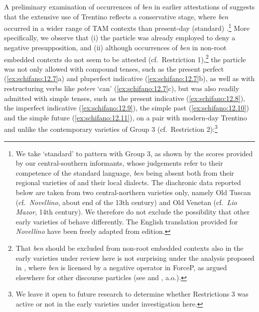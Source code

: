\documentclass[output=paper]{langsci/langscibook}
\begin{document}
A preliminary examination of occurrences of \emph{ben} in earlier attestations
of  suggests that the extensive use of Trentino reflects a
conservative stage, where \emph{ben} occurred in a wider range of \gls{TAM}
contexts than present-day (standard) .\footnote{We take
    \enquote*{standard}  to pattern with Group 3, as shown by the scores
    provided by our central-southern informants, whose judgements refer to
    their competence of the standard language, \emph{ben} being absent both
    from their regional varieties of  and their local  dialects.
    The diachronic data reported below are taken from two central-northern
    varieties only, namely Old Tuscan (cf.\ \emph{Novellino}, about end of the
    13th
    century) and Old Venetan (cf.\ \emph{Lio Mazor}, 14th century). We therefore
    do not exclude the possibility that other early varieties of 
    behave differently.  The English translation provided for \emph{Novellino}
    have been freely adapted from  edition.} More
    specifically, we observe that (i) the particle was already employed to deny
    a negative presupposition, and (ii) although occurrences of \emph{ben} in
    non-root embedded contexts do not seem to be attested (cf.\ Restriction
    1),\footnote{That \emph{ben} should be excluded from non-root embedded
        contexts also in the early varieties under review here is not
        surprising under the analysis proposed in \textcite{CognSchi2018b},
    where \emph{ben} is licensed by a negative operator in ForceP, as argued
elsewhere for other discourse particles (see \citealt{Coniglio2008} and
\citealt{Zimmermann2004,Zimmermann2011}, a.o.).} the particle was not only
allowed with compound tenses, such as the present perfect (\ref{ex:schifano:12.7}a) and pluperfect
indicative (\ref{ex:schifano:12.7}b), as well as with restructuring verbs like \emph{potere} ‘can’
(\ref{ex:schifano:12.7}c), but was also readily admitted with simple tenses, such as the present
indicative (\ref{ex:schifano:12.8}), the imperfect indicative (\ref{ex:schifano:12.9}), the simple past (\ref{ex:schifano:12.10}) and the
simple future (\ref{ex:schifano:12.11}), on a pair with modern-day Trentino and unlike the
contemporary  varieties of Group 3 (cf.\ Restriction 2):\footnote{We
leave it open to future research to determine whether Restrictions 3 was active
or not in the early varieties under investigation here.}
\end{document}
